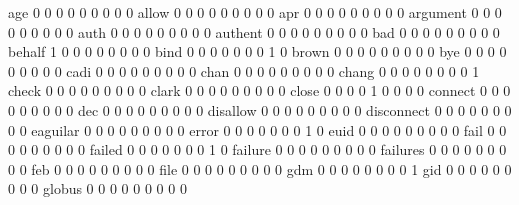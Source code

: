 \documentclass[compress,8pt]{beamer}
\begin{document}
\begin{frame}
\begin{Schunk}
  age                                        0   0   0   0   0   0   0   0   0
  allow                                      0   0   0   0   0   0   0   0   0
  apr                                        0   0   0   0   0   0   0   0   0
  argument                                   0   0   0   0   0   0   0   0   0
  auth                                       0   0   0   0   0   0   0   0   0
  authent                                    0   0   0   0   0   0   0   0   0
  bad                                        0   0   0   0   0   0   0   0   0
  behalf                                     1   0   0   0   0   0   0   0   0
  bind                                       0   0   0   0   0   0   0   1   0
  brown                                      0   0   0   0   0   0   0   0   0
  bye                                        0   0   0   0   0   0   0   0   0
  cadi                                       0   0   0   0   0   0   0   0   0
  chan                                       0   0   0   0   0   0   0   0   0
  chang                                      0   0   0   0   0   0   0   0   1
  check                                      0   0   0   0   0   0   0   0   0
  clark                                      0   0   0   0   0   0   0   0   0
  close                                      0   0   0   0   1   0   0   0   0
  connect                                    0   0   0   0   0   0   0   0   0
  dec                                        0   0   0   0   0   0   0   0   0
  disallow                                   0   0   0   0   0   0   0   0   0
  disconnect                                 0   0   0   0   0   0   0   0   0
  eaguilar                                   0   0   0   0   0   0   0   0   0
  error                                      0   0   0   0   0   0   0   1   0
  euid                                       0   0   0   0   0   0   0   0   0
  fail                                       0   0   0   0   0   0   0   0   0
  failed                                     0   0   0   0   0   0   0   1   0
  failure                                    0   0   0   0   0   0   0   0   0
  failures                                   0   0   0   0   0   0   0   0   0
  feb                                        0   0   0   0   0   0   0   0   0
  file                                       0   0   0   0   0   0   0   0   0
  gdm                                        0   0   0   0   0   0   0   0   1
  gid                                        0   0   0   0   0   0   0   0   0
  globus                                     0   0   0   0   0   0   0   0   0

\end{Schunk}
\end{frame}
\end{document}
